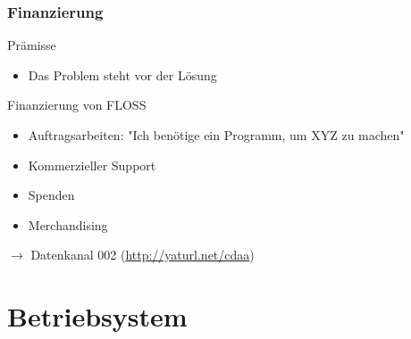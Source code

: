 \documentclass[compress]{beamer}
\begin{document}
\begin{frame}
	\frametitle{Finanzierung}
	\begin{block}{Prämisse}
		\begin{itemize}
			\item Das Problem steht vor der Lösung
		\end{itemize}
	\end{block}
	\pause
	\begin{block}{Finanzierung von FLOSS}
		\begin{itemize}
			\item Auftragsarbeiten: "Ich benötige ein Programm, um XYZ zu machen"
			\item Kommerzieller Support
			\item Spenden
			\item Merchandising 
		\end{itemize}
	\end{block}
	\pause
	$\rightarrow$ Datenkanal 002 (\url{http://yaturl.net/cdaa})
\end{frame}

\section{Betriebsystem}
\end{document}
